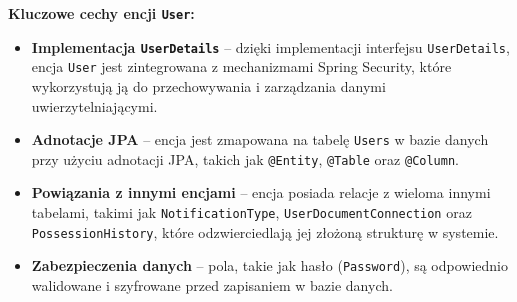 \textbf{Kluczowe cechy encji \texttt{User}:}
\begin{itemize}
    \item \textbf{Implementacja \texttt{UserDetails}} -- dzięki implementacji interfejsu \texttt{UserDetails}, encja \texttt{User} jest zintegrowana z mechanizmami Spring Security, które wykorzystują ją do przechowywania i zarządzania danymi uwierzytelniającymi.
    \item \textbf{Adnotacje JPA} -- encja jest zmapowana na tabelę \texttt{Users} w bazie danych przy użyciu adnotacji JPA, takich jak \texttt{@Entity}, \texttt{@Table} oraz \texttt{@Column}.
    \item \textbf{Powiązania z innymi encjami} -- encja posiada relacje z wieloma innymi tabelami, takimi jak \texttt{NotificationType}, \texttt{UserDocumentConnection} oraz \texttt{PossessionHistory}, które odzwierciedlają jej złożoną strukturę w systemie.
    \item \textbf{Zabezpieczenia danych} -- pola, takie jak hasło (\texttt{Password}), są odpowiednio walidowane i szyfrowane przed zapisaniem w bazie danych.
\end{itemize}

